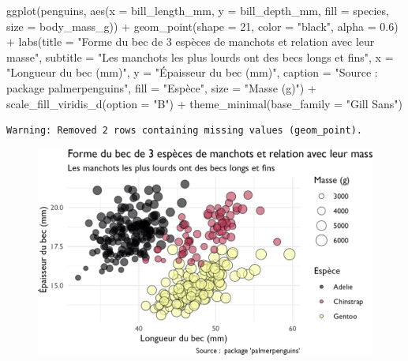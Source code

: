 \documentclass[
  letterpaper,
  DIV=11,
  numbers=noendperiod]{scrreprt}
\newenvironment{Shaded}{\begin{snugshade}}{\end{snugshade}}
\newcommand{\AttributeTok}[1]{\textcolor[rgb]{0.40,0.45,0.13}{#1}}
\newcommand{\DecValTok}[1]{\textcolor[rgb]{0.68,0.00,0.00}{#1}}
\newcommand{\FloatTok}[1]{\textcolor[rgb]{0.68,0.00,0.00}{#1}}
\newcommand{\FunctionTok}[1]{\textcolor[rgb]{0.28,0.35,0.67}{#1}}
\newcommand{\NormalTok}[1]{\textcolor[rgb]{0.00,0.23,0.31}{#1}}
\newcommand{\SpecialCharTok}[1]{\textcolor[rgb]{0.37,0.37,0.37}{#1}}
\newcommand{\StringTok}[1]{\textcolor[rgb]{0.13,0.47,0.30}{#1}}
\begin{document}
\begin{Shaded}
\begin{Highlighting}[]
\FunctionTok{ggplot}\NormalTok{(penguins, }\FunctionTok{aes}\NormalTok{(}\AttributeTok{x =}\NormalTok{ bill\_length\_mm, }\AttributeTok{y =}\NormalTok{ bill\_depth\_mm,}
                     \AttributeTok{fill =}\NormalTok{ species, }\AttributeTok{size =}\NormalTok{ body\_mass\_g)) }\SpecialCharTok{+}
  \FunctionTok{geom\_point}\NormalTok{(}\AttributeTok{shape =} \DecValTok{21}\NormalTok{, }\AttributeTok{color =} \StringTok{"black"}\NormalTok{, }\AttributeTok{alpha =} \FloatTok{0.6}\NormalTok{) }\SpecialCharTok{+}
  \FunctionTok{labs}\NormalTok{(}\AttributeTok{title =} \StringTok{"Forme du bec de 3 espèces de manchots et relation avec leur masse"}\NormalTok{,}
       \AttributeTok{subtitle =} \StringTok{"Les manchots les plus lourds ont des becs longs et fins"}\NormalTok{,}
       \AttributeTok{x =} \StringTok{"Longueur du bec (mm)"}\NormalTok{,}
       \AttributeTok{y =} \StringTok{"Épaisseur du bec (mm)"}\NormalTok{,}
       \AttributeTok{caption =} \StringTok{"Source :  package \textquotesingle{}palmerpenguins\textquotesingle{}"}\NormalTok{,}
       \AttributeTok{fill =} \StringTok{"Espèce"}\NormalTok{,}
       \AttributeTok{size =} \StringTok{"Masse (g)"}\NormalTok{) }\SpecialCharTok{+}
  \FunctionTok{scale\_fill\_viridis\_d}\NormalTok{(}\AttributeTok{option =} \StringTok{"B"}\NormalTok{) }\SpecialCharTok{+}
  \FunctionTok{theme\_minimal}\NormalTok{(}\AttributeTok{base\_family =} \StringTok{"Gill Sans"}\NormalTok{)}
\end{Highlighting}
\end{Shaded}

\begin{verbatim}
Warning: Removed 2 rows containing missing values (geom_point).
\end{verbatim}

\begin{figure}[H]

{\centering \includegraphics{./03-visualization_files/figure-pdf/unnamed-chunk-111-1.png}

}

\end{figure}
\end{document}

